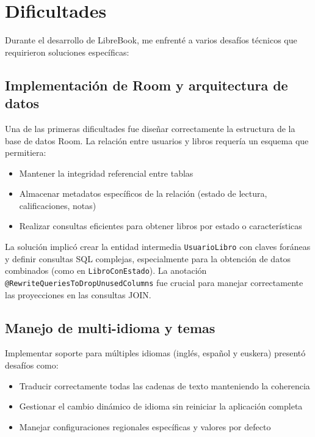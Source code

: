 \documentclass[a4paper,12pt]{report}
\begin{document}
  \chapter{Dificultades}
    Durante el desarrollo de LibreBook, me enfrenté a varios desafíos técnicos que requirieron soluciones específicas:
    
    \section{Implementación de Room y arquitectura de datos}
      Una de las primeras dificultades fue diseñar correctamente la estructura de la base de datos Room\cite{room_documentation}. La relación entre usuarios y libros requería un esquema que permitiera:
      \begin{itemize}
          \item Mantener la integridad referencial entre tablas
          \item Almacenar metadatos específicos de la relación (estado de lectura, calificaciones, notas)
          \item Realizar consultas eficientes para obtener libros por estado o características
      \end{itemize}

      La solución implicó crear la entidad intermedia \texttt{UsuarioLibro} con claves foráneas y definir consultas SQL complejas, especialmente para la obtención de datos combinados (como en \texttt{LibroConEstado}). La anotación \texttt{@RewriteQueriesToDropUnusedColumns} fue crucial para manejar correctamente las proyecciones en las consultas JOIN.

    \section{Manejo de multi-idioma y temas}
      Implementar soporte para múltiples idiomas (inglés, español y euskera) presentó desafíos como\cite{android_localization}:
      \begin{itemize}
          \item Traducir correctamente todas las cadenas de texto manteniendo la coherencia
          \item Gestionar el cambio dinámico de idioma sin reiniciar la aplicación completa
          \item Manejar configuraciones regionales específicas y valores por defecto
      \end{itemize}
      
\end{document}
